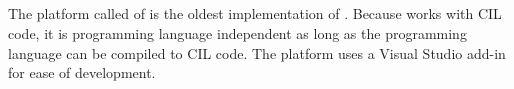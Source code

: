 \subsection{\dotNET}
The \dotNET platform called \Compose*[.NET] of \Compose* is the oldest implementation of \Compose*.
Because \Compose*[.NET] works with CIL code, it is programming language independent as long as the programming language can be compiled to CIL code.
The \dotNET platform uses a Visual Studio add-in for ease of development.
